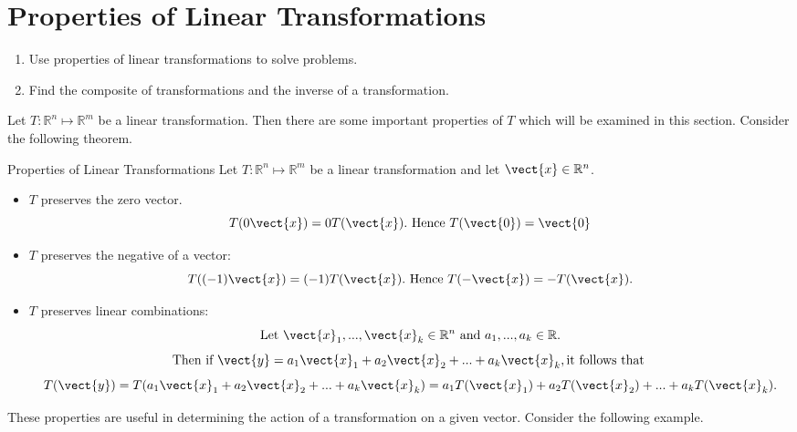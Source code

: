 \section{Properties of Linear Transformations}

\begin{outcome}
\begin{enumerate}
\item[A.] Use properties of linear transformations to solve problems. 

\item[B.] Find the composite of transformations and the inverse of a transformation.
\end{enumerate}
\end{outcome}

Let $T: \mathbb{R}^n \mapsto \mathbb{R}^m$ be a linear transformation. Then there are some important properties of $T$ which will be examined in this section. 
Consider the following theorem.

\begin{theorem}{Properties of Linear Transformations}\label{thm:properties}
Let $T: \mathbb{R}^n \mapsto \mathbb{R}^m$ be a linear transformation and let $\vect{x} \in \mathbb{R}^n$. 

\begin{itemize}
\item $T$ preserves the zero vector. 
\[
T(0\vect{x}) = 0 T(\vect{x}). \mbox{ Hence }T(\vect{0}) = \vect{0}
\]
\item $T$ preserves the negative of a vector:
\[
T( (-1)\vect{x})=(-1)T(\vect{x}). \mbox{ Hence }T(-\vect{x}) = -T(\vect{x}).
\]
\item $T$ preserves linear combinations:
\[
\mbox{Let }\vect{x}_1, ..., \vect{x}_k \in \mathbb{R}^n \mbox{ and }a_1, ..., a_k \in \mathbb{R}.
\]
\[
\mbox{Then if }\vect{y} = a_1\vect{x}_1 + a_2\vect{x}_2 + ...+a_k \vect{x}_k, \mbox{it follows that }
\]
\[
T(\vect{y}) = T(a_1\vect{x}_1 + a_2\vect{x}_2 + ...+a_k \vect{x}_k) = a_1T(\vect{x}_1) + a_2T(\vect{x}_2) + ...+a_k T(\vect{x}_k).
\] 
\end{itemize}
\end{theorem}

These properties are useful in determining the action of a transformation on a given vector. Consider the following example.

